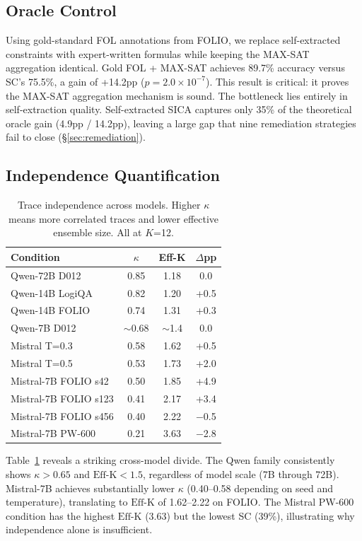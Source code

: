 \documentclass[11pt,a4paper]{article}
\newcommand{\effk}{\text{Eff-K}}
\begin{document}
\subsection{Oracle Control}

Using gold-standard FOL annotations from FOLIO, we replace self-extracted constraints with expert-written formulas while keeping the MAX-SAT aggregation identical. Gold FOL + MAX-SAT achieves 89.7\% accuracy versus SC's 75.5\%, a gain of +14.2pp ($p = 2.0 \times 10^{-7}$). This result is critical: it proves the MAX-SAT aggregation mechanism is sound. The bottleneck lies entirely in self-extraction quality. Self-extracted SICA captures only 35\% of the theoretical oracle gain (4.9pp / 14.2pp), leaving a large gap that nine remediation strategies fail to close (\S\ref{sec:remediation}).

\subsection{Independence Quantification}

\begin{table}[t]
\centering
\small
\caption{Trace independence across models. Higher $\kappa$ means more correlated traces and lower effective ensemble size. All at $K$=12.}
\label{tab:independence}
\begin{tabular}{lccc}
\toprule
\textbf{Condition} & \textbf{$\kappa$} & \textbf{Eff-K} & \textbf{$\Delta$pp} \\
\midrule
Qwen-72B D012 & 0.85 & 1.18 & 0.0 \\
Qwen-14B LogiQA & 0.82 & 1.20 & +0.5 \\
Qwen-14B FOLIO & 0.74 & 1.31 & +0.3 \\
Qwen-7B D012 & $\sim$0.68 & $\sim$1.4 & 0.0 \\
Mistral T=0.3 & 0.58 & 1.62 & +0.5 \\
Mistral T=0.5 & 0.53 & 1.73 & +2.0 \\
Mistral-7B FOLIO s42 & 0.50 & 1.85 & +4.9 \\
Mistral-7B FOLIO s123 & 0.41 & 2.17 & +3.4 \\
Mistral-7B FOLIO s456 & 0.40 & 2.22 & $-$0.5 \\
Mistral-7B PW-600 & 0.21 & 3.63 & $-$2.8 \\
\bottomrule
\end{tabular}
\end{table}

Table~\ref{tab:independence} reveals a striking cross-model divide. The Qwen family consistently shows $\kappa > 0.65$ and $\effk < 1.5$, regardless of model scale (7B through 72B). Mistral-7B achieves substantially lower $\kappa$ (0.40--0.58 depending on seed and temperature), translating to $\effk$ of 1.62--2.22 on FOLIO. The Mistral PW-600 condition has the highest $\effk$ (3.63) but the lowest SC (39\%), illustrating why independence alone is insufficient.
\end{document}
